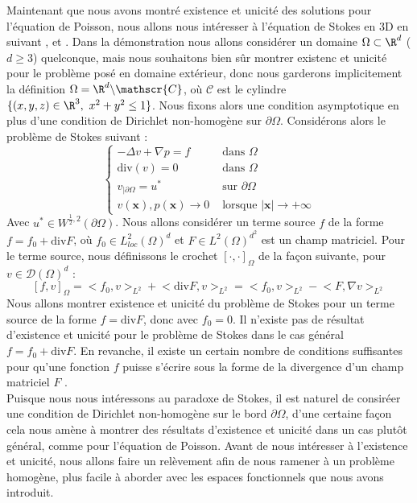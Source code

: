 Maintenant que nous avons montré existence et unicité des solutions pour l'équation de Poisson, nous allons nous intéresser à l'équation de Stokes en 3D en suivant \cite{Ladyshenskaya},\cite{Temam} et \cite{Galdi}. Dans la démonstration nous allons considérer un domaine $\Omega \subset \R^d$ ($d \geq 3$) quelconque, mais nous souhaitons bien sûr montrer existenc et unicité pour le problème posé en domaine extérieur, donc nous garderons implicitement la définition $\Omega = \R^d \backslash \mathscr{C}$, où $\mathscr{C}$ est le cylindre $\{ (x,y,z) \in \R^3,\ x^2 + y^2 \leq 1 \}$.
Nous fixons alors une condition asymptotique en plus d'une condition de Dirichlet non-homogène sur $\partial \Omega$. Considérons alors le problème de Stokes suivant :
$$\begin{cases}
    -\Delta v + \nabla p = f \quad &\text{ dans } \Omega \\
    \text{div}(v) = 0 &\text{ dans } \Omega \\
    v_{|\partial \Omega} = u^* &\text{ sur } \partial \Omega \\
    v(\mathbf{x}),p(\mathbf{x}) \longrightarrow 0 &\text{ lorsque } |\mathbf{x}| \to +\infty
\end{cases}$$
Avec $u^* \in W^{\frac{1}{2},2}(\partial \Omega)$. Nous allons considérer un terme source $f$ de la forme $f = f_0 + \text{div}F$, où $f_0 \in L^2_{loc}(\Omega)^d$ et $F \in L^2(\Omega)^{d^2}$ est un champ matriciel. Pour le terme source, nous définissons le crochet $[\cdot,\cdot]_{\Omega}$ de la façon suivante, pour $v \in \mathcal{D}(\Omega)^d$ :
$$ [f,v]_{\Omega} = \big<f_0,v\big>_{L^2} + \big< \text{div}F,v \big>_{L^2} = \big< f_0, v \big>_{L^2} - \big< F, \nabla v \big>_{L^2} $$
Nous allons montrer existence et unicité du problème de Stokes pour un terme source de la forme $f = \text{div}F$, donc avec $f_0 = 0$. Il n'existe pas de résultat d'existence et unicité pour le problème de Stokes dans le cas général $f = f_0 + \text{div}F$. En revanche, il existe
un certain nombre de conditions suffisantes pour qu'une fonction $f$ puisse s'écrire sous la forme de la divergence d'un champ matriciel $F$ \cite{Sohr}. \\
Puisque nous nous intéressons au paradoxe de Stokes, il est naturel de consiréer une condition de Dirichlet non-homogène sur le bord $\partial \Omega$, d'une certaine façon cela nous amène à montrer des résultats d'existence et unicité dans un cas plutôt général, comme pour l'équation de Poisson.
Avant de nous intéresser à l'existence et unicité, nous allons faire un relèvement afin de nous ramener à un problème homogène, plus facile à aborder avec les espaces fonctionnels que nous avons introduit. \\

